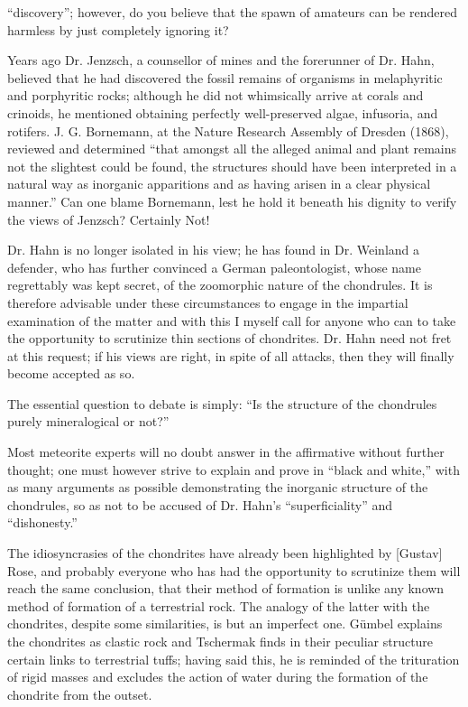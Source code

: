 \documentclass[a4paper, 12pt, oneside]{article}
\begin{document}
``discovery''; however, do you believe that the spawn of amateurs can be rendered harmless by just completely ignoring it?

Years ago Dr. Jenzsch, a counsellor of mines and the forerunner of Dr. Hahn, believed that he had discovered the fossil remains of organisms in melaphyritic and porphyritic rocks; although he did not whimsically arrive at corals and crinoids, he mentioned obtaining perfectly well-preserved algae, infusoria, and rotifers. J. G. Bornemann, at the Nature Research Assembly of Dresden (1868), reviewed and determined ``that amongst all the alleged animal and plant remains not the slightest could be found, the structures should have been interpreted in a natural way as inorganic apparitions and as having arisen in a clear physical manner.'' Can one blame Bornemann, lest he hold it beneath his dignity to verify the views of Jenzsch? Certainly Not!

Dr. Hahn is no longer isolated in his view; he has found in Dr. Weinland a defender, who has further convinced a German paleontologist, whose name regrettably was kept secret, of the zoomorphic nature of the chondrules. It is therefore advisable under these circumstances to engage in the impartial examination of the matter and with this I myself call for anyone who can to take the opportunity to scrutinize thin sections of chondrites. Dr. Hahn need not fret at this request; if his views are right, in spite of all attacks, then they will finally become accepted as so.

The essential question to debate is simply: ``Is the structure of the chondrules purely mineralogical or not?''

Most meteorite experts will no doubt answer in the affirmative without further thought; one must however strive to explain and prove in ``black and white,'' with as many arguments as possible demonstrating the inorganic structure of the chondrules, so as not to be accused of Dr. Hahn's ``superficiality'' and ``dishonesty.''

The idiosyncrasies of the chondrites have already been highlighted by [Gustav] Rose, and probably everyone who has had the opportunity to scrutinize them will reach the same conclusion, that their method of formation is unlike any known method of formation of a terrestrial rock. The analogy of the latter with the chondrites, despite some similarities, is but an imperfect one. Gümbel explains the chondrites as clastic rock and Tschermak finds in their peculiar structure certain links to terrestrial tuffs; having said this, he is reminded of the trituration of rigid masses and excludes the action of water during the formation of the chondrite from the outset.
\end{document}
